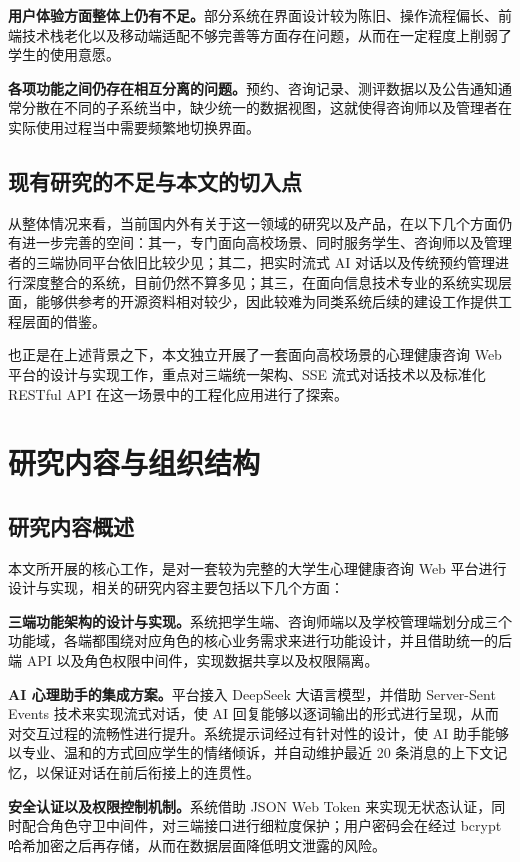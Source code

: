 \textbf{用户体验方面整体上仍有不足。}部分系统在界面设计较为陈旧、操作流程偏长、前端技术栈老化以及移动端适配不够完善等方面存在问题，从而在一定程度上削弱了学生的使用意愿。

\textbf{各项功能之间仍存在相互分离的问题。}预约、咨询记录、测评数据以及公告通知通常分散在不同的子系统当中，缺少统一的数据视图，这就使得咨询师以及管理者在实际使用过程当中需要频繁地切换界面。

\subsection{现有研究的不足与本文的切入点}

从整体情况来看，当前国内外有关于这一领域的研究以及产品，在以下几个方面仍有进一步完善的空间：其一，专门面向高校场景、同时服务学生、咨询师以及管理者的三端协同平台依旧比较少见；其二，把实时流式 AI 对话以及传统预约管理进行深度整合的系统，目前仍然不算多见；其三，在面向信息技术专业的系统实现层面，能够供参考的开源资料相对较少，因此较难为同类系统后续的建设工作提供工程层面的借鉴。

也正是在上述背景之下，本文独立开展了一套面向高校场景的心理健康咨询 Web 平台的设计与实现工作，重点对三端统一架构、SSE 流式对话技术以及标准化 RESTful API 在这一场景中的工程化应用进行了探索。


\section{研究内容与组织结构}

\subsection{研究内容概述}

本文所开展的核心工作，是对一套较为完整的大学生心理健康咨询 Web 平台进行设计与实现，相关的研究内容主要包括以下几个方面：

\textbf{三端功能架构的设计与实现。}系统把学生端、咨询师端以及学校管理端划分成三个功能域，各端都围绕对应角色的核心业务需求来进行功能设计，并且借助统一的后端 API 以及角色权限中间件，实现数据共享以及权限隔离。

\textbf{AI 心理助手的集成方案。}平台接入 DeepSeek 大语言模型\cite{deepseek2024}，并借助 Server-Sent Events 技术来实现流式对话，使 AI 回复能够以逐词输出的形式进行呈现，从而对交互过程的流畅性进行提升。系统提示词经过有针对性的设计，使 AI 助手能够以专业、温和的方式回应学生的情绪倾诉，并自动维护最近 20 条消息的上下文记忆，以保证对话在前后衔接上的连贯性。

\textbf{安全认证以及权限控制机制。}系统借助 JSON Web Token 来实现无状态认证\cite{jones2015}，同时配合角色守卫中间件，对三端接口进行细粒度保护；用户密码会在经过 bcrypt 哈希加密之后再存储\cite{provos1999}，从而在数据层面降低明文泄露的风险。

